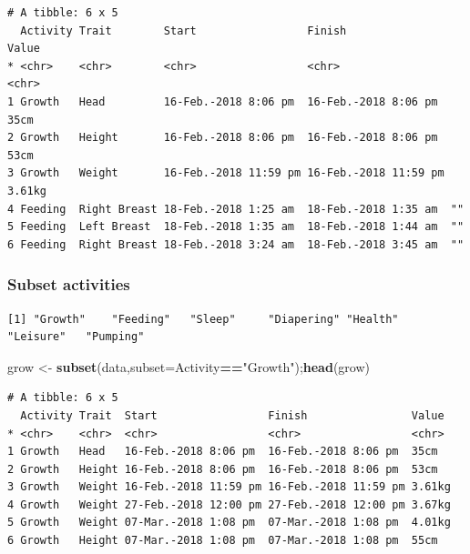 \documentclass[10,portrait]{article}
\newenvironment{Shaded}{\begin{snugshade}}{\end{snugshade}}
\newcommand{\KeywordTok}[1]{\textcolor[rgb]{0.13,0.29,0.53}{\textbf{#1}}}
\newcommand{\DataTypeTok}[1]{\textcolor[rgb]{0.13,0.29,0.53}{#1}}
\newcommand{\StringTok}[1]{\textcolor[rgb]{0.31,0.60,0.02}{#1}}
\newcommand{\OperatorTok}[1]{\textcolor[rgb]{0.81,0.36,0.00}{\textbf{#1}}}
\newcommand{\NormalTok}[1]{#1}
\begin{document}
\begin{verbatim}
# A tibble: 6 x 5
  Activity Trait        Start                 Finish                Value 
* <chr>    <chr>        <chr>                 <chr>                 <chr> 
1 Growth   Head         16-Feb.-2018 8:06 pm  16-Feb.-2018 8:06 pm  35cm  
2 Growth   Height       16-Feb.-2018 8:06 pm  16-Feb.-2018 8:06 pm  53cm  
3 Growth   Weight       16-Feb.-2018 11:59 pm 16-Feb.-2018 11:59 pm 3.61kg
4 Feeding  Right Breast 18-Feb.-2018 1:25 am  18-Feb.-2018 1:35 am  ""    
5 Feeding  Left Breast  18-Feb.-2018 1:35 am  18-Feb.-2018 1:44 am  ""    
6 Feeding  Right Breast 18-Feb.-2018 3:24 am  18-Feb.-2018 3:45 am  ""    
\end{verbatim}

\subsubsection{Subset activities}\label{subset-activities}

\begin{Shaded}
\end{Shaded}

\begin{verbatim}
[1] "Growth"    "Feeding"   "Sleep"     "Diapering" "Health"    "Leisure"   "Pumping"  
\end{verbatim}

\begin{Shaded}
\begin{Highlighting}[]
\NormalTok{grow <-}\StringTok{ }\KeywordTok{subset}\NormalTok{(data,}\DataTypeTok{subset=}\NormalTok{Activity}\OperatorTok{==}\StringTok{"Growth"}\NormalTok{);}\KeywordTok{head}\NormalTok{(grow)}
\end{Highlighting}
\end{Shaded}

\begin{verbatim}
# A tibble: 6 x 5
  Activity Trait  Start                 Finish                Value 
* <chr>    <chr>  <chr>                 <chr>                 <chr> 
1 Growth   Head   16-Feb.-2018 8:06 pm  16-Feb.-2018 8:06 pm  35cm  
2 Growth   Height 16-Feb.-2018 8:06 pm  16-Feb.-2018 8:06 pm  53cm  
3 Growth   Weight 16-Feb.-2018 11:59 pm 16-Feb.-2018 11:59 pm 3.61kg
4 Growth   Weight 27-Feb.-2018 12:00 pm 27-Feb.-2018 12:00 pm 3.67kg
5 Growth   Weight 07-Mar.-2018 1:08 pm  07-Mar.-2018 1:08 pm  4.01kg
6 Growth   Height 07-Mar.-2018 1:08 pm  07-Mar.-2018 1:08 pm  55cm  
\end{verbatim}
\end{document}

